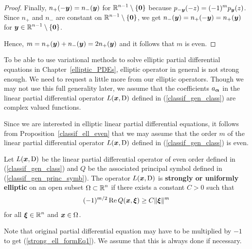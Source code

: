\begin{proof}
Finally, $n_+(-{\bm{y}}) = n_-({\bm{y}})$ for
$\displaystyle \mathbb{R}^{n-1}\setminus\{{\bm{0}}\}$ because
$\displaystyle p_{-{\bm{y}}}(-z) = (-1)^m p_{{\bm{y}}}(z)$.  Since $n_+$
and $n_-$ are constant on $\displaystyle \mathbb{R}^{n-1}\setminus\{{\bm{0}}\}$, we get
$n_-({\bm{y}}) = n_+(-{\bm{y}}) = n_+({\bm{y}})$ for
$\displaystyle {\bm{y}} \in \mathbb{R}^{n-1}\setminus\{{\bm{0}}\}$.

Hence, $m = n_+({\bm{y}})+n_-({\bm{y}}) = 2n_+({\bm{y}})$ and it follows
that $m$ is even.
\end{proof}

To be able to use variational methods to solve elliptic partial
differential equations in Chapter~\ref{elliptic_PDEs}, elliptic
operator in general is not strong enough.  We need to request a little
more from our elliptic operators.
Though we may not use this full generality later, we assume that the
coefficients $a_{{\bm{\alpha}}}$ in the linear partial differential operator
$L({\bm{x}}, \operatorname{D})$ defined in (\ref{classif_gen_class}) are complex
valued functions.

Since we are interested in elliptic linear partial differential
equations, it follows from Proposition~\ref{classif_ell_even} that we
may assume that the order $m$ of the linear partial differential operator
$L({\bm{x}}, \operatorname{D})$ defined in (\ref{classif_gen_class}) is even.

\begin{defn} \label{strong_ell_form}
Let $L({\bm{x}}, \operatorname{D})$ be the linear partial differential operator of
even order defined in (\ref{classif_gen_class}) and $Q$ be the
associated principal symbol defined in (\ref{classif_gen_princ_symb}).
The operator $L({\bm{x}}, \operatorname{D})$ is
{\bfseries strongly or uniformly elliptic}%
%
on an open subset $\displaystyle \Omega \subset \mathbb{R}^n$ if there exists
a constant $C>0$ such that
\begin{equation} \label{strong_ell_formEq1}
(-1)^{m/2} \operatorname{Re} Q({\bm{x}}, {\bm{\xi}}) \geq C \|{\bm{\xi}}\|^m
\end{equation}
for all $\displaystyle {\bm{\xi}} \in \mathbb{R}^n$ and ${\bm{x}}\in \Omega$.
\end{defn}

Note that original partial differential equation may have to be
multiplied by $-1$ to get (\ref{strong_ell_formEq1}).  We assume that
this is always done if necessary.

